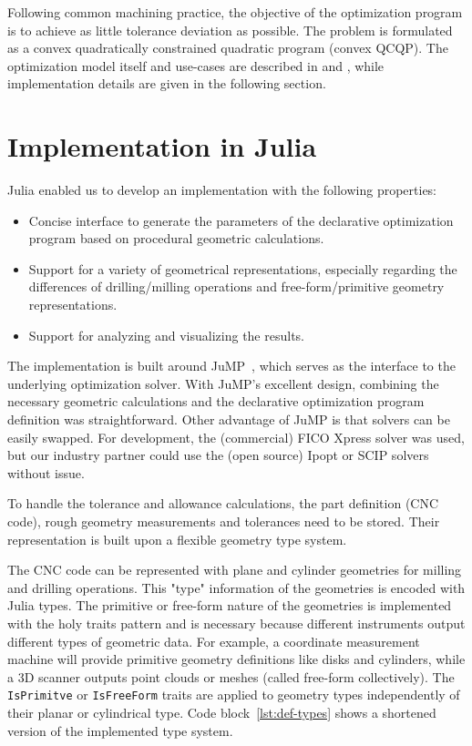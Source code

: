 \documentclass{juliacon}
\begin{document}
Following common machining practice, the objective of the optimization program is to achieve as little tolerance deviation as possible.
The problem is formulated as a convex quadratically constrained quadratic program (convex QCQP).
The optimization model itself and use-cases are described in \cite{cserteg:2023_CMS} and \cite{cserteg:2023_Annals}, while implementation details are given in the following section.

\section{Implementation in Julia}
\label{sec:approach}

Julia enabled us to develop an implementation with the following properties:
\begin{itemize}
	\item Concise interface to generate the parameters of the declarative optimization program based on procedural geometric calculations.
	\item Support for a variety of geometrical representations, especially regarding the differences of drilling/milling operations and free-form/primitive geometry representations.
	\item Support for analyzing and visualizing the results.
\end{itemize}

The implementation is built around JuMP~\cite{Lubin2023}, which serves as the interface to the underlying optimization solver.
With JuMP's excellent design, combining the necessary geometric calculations and the declarative optimization program definition was straightforward.
Other advantage of JuMP is that solvers can be easily swapped.
For development, the (commercial) FICO Xpress solver was used, but our industry partner could use the (open source) Ipopt or SCIP solvers without issue.

To handle the tolerance and allowance calculations, the part definition (CNC code), rough geometry measurements and tolerances need to be stored.
Their representation is built upon a flexible geometry type system.

The CNC code can be represented with plane and cylinder geometries for milling and drilling operations.
This "type" information of the geometries is encoded with Julia types.
The primitive or free-form nature of the geometries is implemented with the holy traits pattern and is necessary because different instruments output different types of geometric data.
For example, a coordinate measurement machine will provide primitive geometry definitions like disks and cylinders, while a 3D scanner outputs point clouds or meshes (called free-form collectively).
The \texttt{IsPrimitve} or \texttt{IsFreeForm} traits are applied to geometry types independently of their planar or cylindrical type.
Code block~\ref{lst:def-types} shows a shortened version of the implemented type system.
\end{document}
